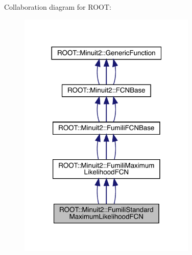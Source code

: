 Collaboration diagram for R\+O\+OT\+:
\nopagebreak
\begin{figure}[H]
\begin{center}
\leavevmode
\includegraphics[width=240pt]{d2/dde/classROOT_1_1Minuit2_1_1FumiliStandardMaximumLikelihoodFCN__coll__graph}
\end{center}
\end{figure}
